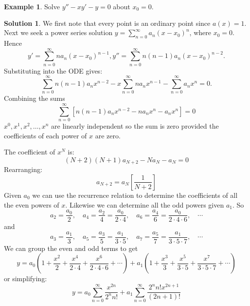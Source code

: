 \documentclass{article}
\theoremstyle{plain}
\theoremstyle{definition}
\newtheorem{exmp}{Example}[section]
\newtheorem*{sol}{Solution}
\numberwithin{equation}{section}
\begin{document}
\begin{tcolorbox}
    \begin{exmp}
        Solve $y'' -xy' - y = 0$ about $x_0=0$.
    \end{exmp}
    \begin{sol}
        We first note that every point is an ordinary point since $a(x)=1$. Next we seek a power series solution $y=\sum_{n=0}^{\infty} a_n(x-x_0)^n$, where $x_0 = 0$.
        Hence
        \[
        y' = \sum_{n=0}^{\infty} na_n(x-x_0)^{n-1}, y''= \sum_{n=0}^{\infty} n(n-1)a_n(x-x_0)^{n-2}.
        \]
        Substituting into the ODE gives:
        \[
        \sum_{n=0}^{\infty} n(n-1)a_nx^{n-2} - x \sum_{n=0}^{\infty} na_nx^{n-1} - \sum_{n=0}^{\infty} a_nx^n = 0.
        \]
        Combining the sums
        \[
            \sum_{n=0}^{\infty}  \left[ n(n-1)a_nx^{n-2} - na_nx^n - a_nx^n \right] = 0
        \]
        $x^0, x^1, x^2, \ldots, x^n$ are linearly independent so the sum is zero provided the coefficients of each power of $x$ are zero.

        The coefficient of $x^N$ is:
        \[
        (N+2)(N+1)a_{N+2} - Na_N - a_N = 0
        \]
        Rearranging:
        \begin{equation}
            \tag{Recurrence relation}
            a_{N+2} = a_N \left[ \frac{1}{N+2} \right]
        \end{equation}
        Given $a_0$ we can use the recurrence relation to determine the coefficients of all the even powers of $x$. Likewise we can determine all the odd powers given $a_1$. So
        \[
        a_2 = \frac{a_0}{2}, \quad a_4=\frac{a_2}{4}=\frac{a_0}{2\cdot 4}, \quad a_6=\frac{a_4}{6}=\frac{a_0}{2\cdot4\cdot6}, \quad\cdots
        \]
        and
        \[
        a_3 = \frac{a_1}{3}, \quad a_5=\frac{a_3}{5}=\frac{a_1}{3\cdot 5}, \quad a_7=\frac{a_5}{7}=\frac{a_1}{3\cdot5\cdot7}, \quad\cdots
        \]
        We can group the even and odd terms to get
        \[
         y = a_0\left(1+\frac{x^2}{2} + \frac{x^4}{2\cdot4} + \frac{x^6}{2\cdot4\cdot6} + \cdots\right) + a_1\left(1+\frac{x^3}{3} + \frac{x^5}{3\cdot5} + \frac{x^7}{3\cdot5\cdot7} + \cdots\right)
        \]
        or simplifying:
        \[
            y = a_0 \sum_{n=0}^{\infty} \frac{x^{2n}}{2^nn!} + a_1\sum_{n=0}^{\infty}\frac{2^nn!x^{2n+1}}{(2n+1)!}
        \]
    \end{sol}
    
\end{tcolorbox}
\end{document}
